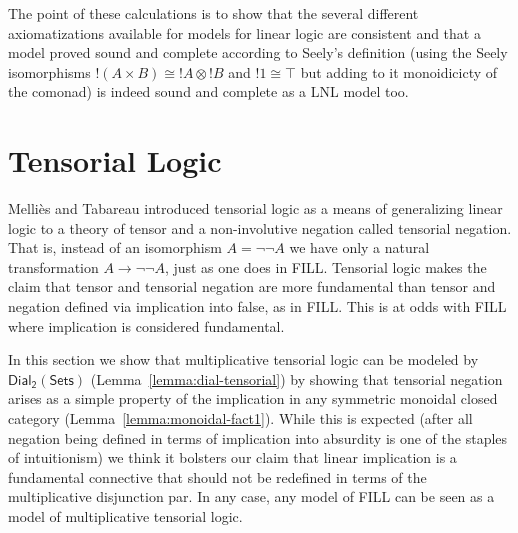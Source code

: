 \documentclass[preprint,6pt]{elsarticle}
\newcommand{\dial}[0]{\mathsf{Dial_2}(\mathsf{Sets})}
\begin{document}

The point of these calculations is to show that the several different
axiomatizations available for models for linear logic are consistent
and that a model proved sound and complete according to Seely's
definition (using the Seely isomorphisms $!(A \times B)\cong !A\otimes
!B$ and $!1\cong \top$ but adding to it monoidicicty of the comonad)
is indeed sound and complete as a LNL model too.

\section{Tensorial Logic}
\label{sec:tensor_logic}

Melli\`es and Tabareau introduced tensorial logic \cite{Mellies:2008} as a means of
generalizing linear logic to a theory of tensor and a non-involutive
negation called tensorial negation.  That is, instead of an
isomorphism $A = \lnot\lnot A$ we have only a natural transformation
$A \to \lnot\lnot A$, just as one does in FILL.  Tensorial logic makes the
claim that tensor and tensorial negation are more fundamental than
tensor and negation defined via implication into false, as in FILL.  This is at odds with
FILL where implication is considered  fundamental. 

In this
section we show that multiplicative tensorial logic can be modeled by
$\dial$ (Lemma~\ref{lemma:dial-tensorial}) by showing that tensorial
negation arises as a simple property of the implication in any symmetric monoidal closed category
(Lemma~\ref{lemma:monoidal-fact1}).  While this is expected (after all
negation being defined in terms of implication into absurdity is one
of the staples of intuitionism) we think it bolsters our claim that
linear implication is a fundamental connective that should not be
redefined in terms of the multiplicative disjunction par.  In any
case, any model of FILL can be seen as a model of multiplicative
tensorial logic.  
\end{document}
